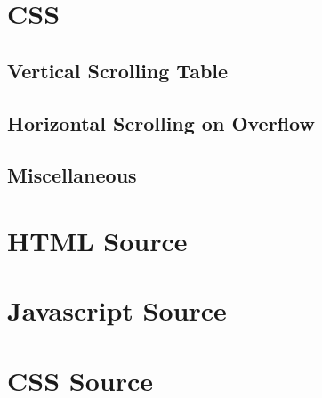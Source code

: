 \documentclass[letterpaper]{article}
\begin{document}
\newpage

\section{CSS}\label{CSS}

\subsection{Vertical Scrolling Table}

\subsection{Horizontal Scrolling on Overflow}\label{overflow-x}

\subsection{Miscellaneous}

\newpage

\appendix
\section{HTML Source}


\newpage

\section{Javascript Source}


\newpage

\section{CSS Source}

\end{document}
